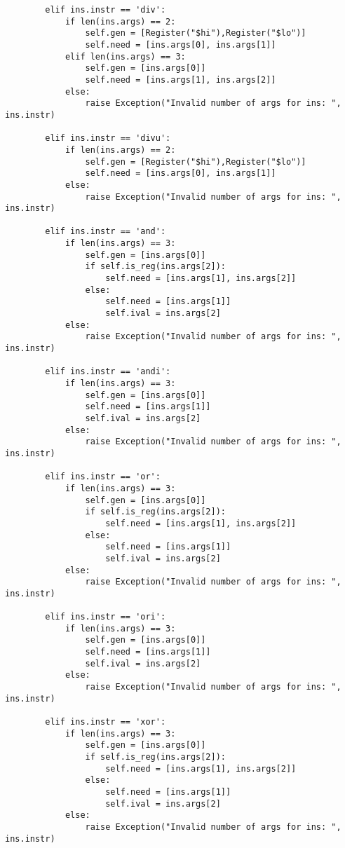 \begin{lstlisting}
        elif ins.instr == 'div':  
            if len(ins.args) == 2:
                self.gen = [Register("$hi"),Register("$lo")]
                self.need = [ins.args[0], ins.args[1]]
            elif len(ins.args) == 3:
                self.gen = [ins.args[0]]
                self.need = [ins.args[1], ins.args[2]]                
            else:
                raise Exception("Invalid number of args for ins: ", ins.instr)   
                        
        elif ins.instr == 'divu': 
            if len(ins.args) == 2:
                self.gen = [Register("$hi"),Register("$lo")]
                self.need = [ins.args[0], ins.args[1]]
            else:
                raise Exception("Invalid number of args for ins: ", ins.instr)   
                        
        elif ins.instr == 'and': 
            if len(ins.args) == 3:
                self.gen = [ins.args[0]]
                if self.is_reg(ins.args[2]):
                    self.need = [ins.args[1], ins.args[2]]
                else: 
                    self.need = [ins.args[1]]
                    self.ival = ins.args[2]
            else:
                raise Exception("Invalid number of args for ins: ", ins.instr)  
                         
        elif ins.instr == 'andi': 
            if len(ins.args) == 3:
                self.gen = [ins.args[0]]
                self.need = [ins.args[1]]
                self.ival = ins.args[2]
            else:
                raise Exception("Invalid number of args for ins: ", ins.instr)           
                
        elif ins.instr == 'or':   
            if len(ins.args) == 3:
                self.gen = [ins.args[0]]
                if self.is_reg(ins.args[2]):
                    self.need = [ins.args[1], ins.args[2]]
                else: 
                    self.need = [ins.args[1]]
                    self.ival = ins.args[2]
            else:
                raise Exception("Invalid number of args for ins: ", ins.instr)  
                        
        elif ins.instr == 'ori':  
            if len(ins.args) == 3:
                self.gen = [ins.args[0]]
                self.need = [ins.args[1]]
                self.ival = ins.args[2]
            else:
                raise Exception("Invalid number of args for ins: ", ins.instr)           
                
        elif ins.instr == 'xor':  
            if len(ins.args) == 3:
                self.gen = [ins.args[0]]
                if self.is_reg(ins.args[2]):
                    self.need = [ins.args[1], ins.args[2]]
                else: 
                    self.need = [ins.args[1]]
                    self.ival = ins.args[2]
            else:
                raise Exception("Invalid number of args for ins: ", ins.instr) 
                         

\end{lstlisting}
